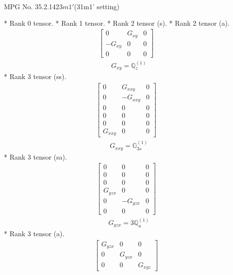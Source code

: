 \documentclass[fleqn,8pt,landscape]{jsarticle}
\begin{document}
\setcounter{MaxMatrixCols}{32}

\renewcommand{\tablename}{Table~}
\renewcommand{\figurename}{Figure~}
\begin{center}
\LARGE
MPG No. 35.2.142\quad$3m1'$\quad(31m1' setting)
\end{center}
* Rank 0 tensor.
* Rank 1 tensor.
* Rank 2 tensor (s).
* Rank 2 tensor (a).
\begin{align*}
\begin{bmatrix} 0 & G_{xy} & 0 \\ - G_{xy} & 0 & 0 \\ 0 & 0 & 0 \end{bmatrix}
\end{align*}
\begin{align*}
& G_{xy} = \mathbb{Q}_{z}^{(1)}
\end{align*}
* Rank 3 tensor (ss).
\begin{align*}
\begin{bmatrix} 0 & G_{xxy} & 0 \\ 0 & - G_{xxy} & 0 \\ 0 & 0 & 0 \\ 0 & 0 & 0 \\ 0 & 0 & 0 \\ G_{xxy} & 0 & 0 \end{bmatrix}
\end{align*}
\begin{align*}
& G_{xxy} = \mathbb{G}_{3s}^{(1)}
\end{align*}
* Rank 3 tensor (sa).
\begin{align*}
\begin{bmatrix} 0 & 0 & 0 \\ 0 & 0 & 0 \\ 0 & 0 & 0 \\ G_{yzx} & 0 & 0 \\ 0 & - G_{yzx} & 0 \\ 0 & 0 & 0 \end{bmatrix}
\end{align*}
\begin{align*}
& G_{yzx} = 3 \mathbb{Q}_{u}^{(1)}
\end{align*}
* Rank 3 tensor (a).
\begin{align*}
\begin{bmatrix} G_{yzx} & 0 & 0 \\ 0 & G_{yzx} & 0 \\ 0 & 0 & G_{xyz} \end{bmatrix}
\end{align*}
\end{document}
